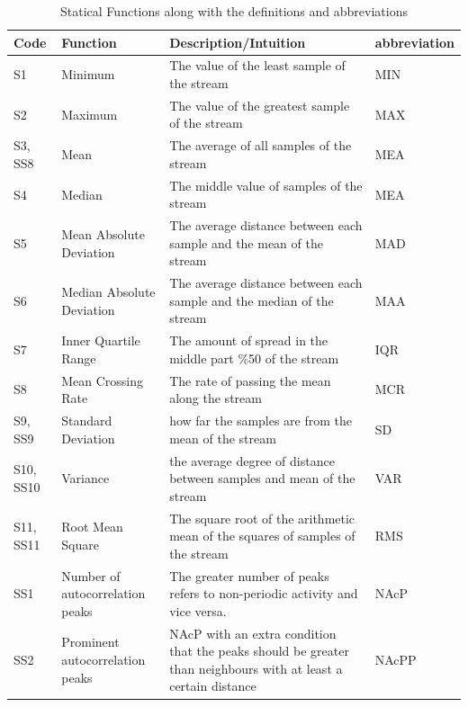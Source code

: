 \documentclass[journal,article,submit,moreauthors,pdftex]{Definitions/mdpi}
\begin{document}
\begin{table}[H]
	\caption{Statical Functions along with the definitions and abbreviations }
	\centering
	\begin{tabular}{p{0.9cm}p{5cm}p{7cm}p{1.3cm}}
		\toprule
		\textbf{Code} & \textbf{Function} & \textbf{Description/Intuition} & \textbf{{\scriptsize abbreviation}} \\
		\midrule
		{\footnotesize S1}&Minimum & {\scriptsize The value of the least sample of the stream}& MIN\\
		S2&Maximum & {\scriptsize The value of the greatest sample of the stream}& MAX\\
		{\footnotesize S3, SS8}&Mean&  {\scriptsize The average of all samples of the stream}& MEA\\
		{\footnotesize S4}&Median&  {\scriptsize The middle value of samples of the stream}& MEA\\
		{\footnotesize S5}&{\footnotesize Mean Absolute Deviation}& {\scriptsize The average distance between each sample and the mean of the stream}& MAD\\
		{\footnotesize S6}&{\footnotesize Median Absolute Deviation}& {\scriptsize The average distance between each sample and the median of the stream}& MAA\\
		{\footnotesize S7}&Inner Quartile Range  & {\scriptsize The amount of spread in the middle part \%50 of the stream}& IQR\\
		{\footnotesize S8}&Mean Crossing Rate& {\scriptsize The rate of passing the mean along the stream}& MCR\\
		{\footnotesize S9, SS9}&Standard Deviation& {\scriptsize how far the samples are from the mean of the stream}& SD\\
		{\footnotesize S10, SS10}&Variance& {\scriptsize the average degree of distance between samples and mean of the stream}& VAR\\
		{\footnotesize S11, SS11}&Root Mean Square& {\scriptsize The square root of the arithmetic mean of the squares of samples of the stream}& RMS\\
		{\footnotesize SS1}&Number of autocorrelation peaks& {\scriptsize The greater number of peaks refers to non-periodic activity and vice versa. }& NAcP\\
		{\footnotesize SS2}&Prominent autocorrelation peaks&{\scriptsize NAcP with an extra condition that the peaks should be greater than neighbours with at least a certain distance} & NAcPP \\

\end{tabular}
\end{table}
\end{document}
